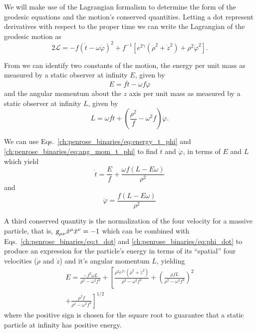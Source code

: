 We will make use of the Lagrangian formalism to determine the form of the geodesic equations and the motion's conserved quantities. Letting a dot represent derivatives with respect to the proper time we can write the Lagrangian of the geodesic motion as~\cite{CARROLL}
%
\begin{equation}
  2\mathcal{L} = -f(\dot{t} - \omega\dot{\varphi})^2 +f^{-1}\left[e^{2\gamma}\left( \dot{\rho}^2 + \dot{z}^2 \right) + \rho^2\dot{\varphi}^2 \right].
  \label{ch:penrose_binaries/eq:lagrangian}
\end{equation}

From  we can identify two constants of the motion, the energy per unit mass as measured by a static observer at infinity $E$, given by
%
\begin{equation}
  E = f\dot{t} - \omega f\dot{\varphi}
  \label{ch:penrose_binaries/eq:energy_t_phi}
\end{equation}
%
and the angular momentum about the $z$ axis per unit mass as measured by a static observer at infinity $L$, given by
%
\begin{equation}
  L = \omega f \dot{t} + \left( \frac{\rho^2}{f} - \omega^2 f \right)\dot{\varphi}.
  \label{ch:penrose_binaries/eq:ang_mom_t_phi}
\end{equation}

We can use Eqs.~\eqref{ch:penrose_binaries/eq:energy_t_phi} and \eqref{ch:penrose_binaries/eq:ang_mom_t_phi} to find $\dot{t}$ and $\dot{\varphi}$, in terms of $E$ and $L$ which yield
%
\begin{equation}
  \dot{t} = \frac{E}{f} + \frac{\omega f (L - E\omega)}{\rho^2}
  \label{ch:penrose_binaries/eq:t_dot}
\end{equation}
%
and
%
\begin{equation}
  \dot{\varphi} = \frac{f (L - E\omega)}{\rho^2}
  \label{ch:penrose_binaries/eq:phi_dot}
\end{equation}

A third conserved quantity is the normalization of the four velocity for a massive particle, that is, $\mtrtens{\mu}{\nu}\dot{x}^\mu\dot{x}^\nu = -1$ which can be combined with Eqs.~\eqref{ch:penrose_binaries/eq:t_dot} and \eqref{ch:penrose_binaries/eq:phi_dot} to produce an expression for the particle's energy in terms of its ``spatial'' four velocities ($\dot{\rho}$ and $\dot{z}$) and it's angular momentum $L$, yielding
%
\begin{multline}
  E = \frac{-f^2\omega L}{\rho^2-\omega^2 f^2} + \left[ \frac{\rho^2e^{2\gamma}(\dot{\rho}^2 + \dot{z}^2)}{\rho^2 - \omega^2f^2} + \left( \frac{\rho fL}{\rho^2 - \omega^2f^2} \right)^2 \right. \\
  \left. + \frac{\rho^2f}{\rho^2 - \omega^2f^2} \right]^{1/2}
  \label{ch:penrose_binaries/eq:energy_rho_z}
\end{multline}
%
where the positive sign is chosen for the square root to guarantee that a static particle at infinity has positive energy.

